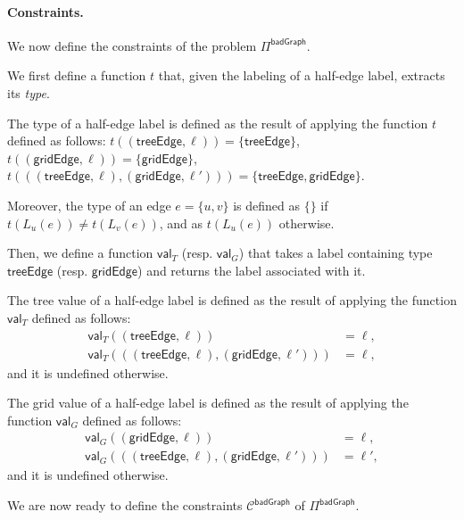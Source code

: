 \documentclass[11pt]{article}
\newcommand{\lgridedge}{\mathsf {gridEdge}}
\newcommand{\ltreeedge}{\mathsf {treeEdge}}
\newcommand{\lbadgraph}{\mathsf {badGraph}}
\newcommand{\fvaluegrid}{\mathsf{val}_G}
\newcommand{\fvaluetree}{\mathsf{val}_T}
\begin{document}
\paragraph{Constraints.}
We now define the constraints of the problem $\Pi^{\lbadgraph}$.

We first define a function $t$ that, given the labeling of a half-edge label, extracts its \emph{type}.
\begin{definition}
	The type of a half-edge label is defined as the result of applying the function $t$ defined as follows:
  $t((\ltreeedge,\ell)) = \{\ltreeedge\}$, $t((\lgridedge,\ell)) = \{\lgridedge\}$, $t(((\ltreeedge,\ell),(\lgridedge,\ell'))) = \{\ltreeedge,\lgridedge\}$.
  
  Moreover, the type of an edge $e = \{u,v\}$ is defined as $\{\}$ if $t(L_u(e)) \neq t(L_v(e))$, and as $t(L_u(e))$ otherwise.
\end{definition}

Then, we define a function $\fvaluetree$ (resp. $\fvaluegrid$) that takes a label containing type $\ltreeedge$ (resp. $\lgridedge$) and returns the label associated with it.
\begin{definition}
	The tree value of a half-edge label is defined as the result of applying the function $\fvaluetree$ defined as follows:
	\begin{align*}
		\fvaluetree((\ltreeedge,\ell)) &= \ell, \\
		\fvaluetree(((\ltreeedge,\ell),(\lgridedge,\ell'))) &= \ell,
	\end{align*}
	and it is undefined otherwise.
\end{definition}
\begin{definition}
	The grid value of a half-edge label is defined as the result of applying the function $\fvaluegrid$ defined as follows:
	\begin{align*}
		\fvaluegrid((\lgridedge,\ell)) &= \ell, \\
		\fvaluegrid(((\ltreeedge,\ell),(\lgridedge,\ell'))) &= \ell',
	\end{align*}
	and it is undefined otherwise.
\end{definition}
We are now ready to define the constraints  $\mathcal{C}^{\lbadgraph}$ of $\Pi^{\lbadgraph}$.
\end{document}
